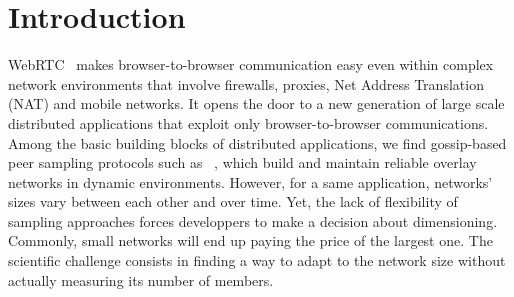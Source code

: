 
\section{Introduction}


WebRTC~\cite{webrtc} makes browser-to-browser communication easy even within
complex network environments that involve firewalls, proxies, Net Address
Translation (NAT) and mobile networks. It opens the door to a new generation of
large scale distributed applications that exploit only browser-to-browser
communications. Among the basic building blocks of distributed applications, we
find gossip-based peer sampling protocols such as
\CYCLON~\cite{voulgaris2005cyclon}, which build and maintain reliable overlay
networks in dynamic environments. However, for a same application, networks'
sizes vary between each other and over time. Yet, the lack of flexibility of
sampling approaches forces developpers to make a decision about
dimensioning. Commonly, small networks will end up paying the price of the
largest one.
The scientific challenge consists in finding a way to adapt to the network size
without actually measuring its number of members.


